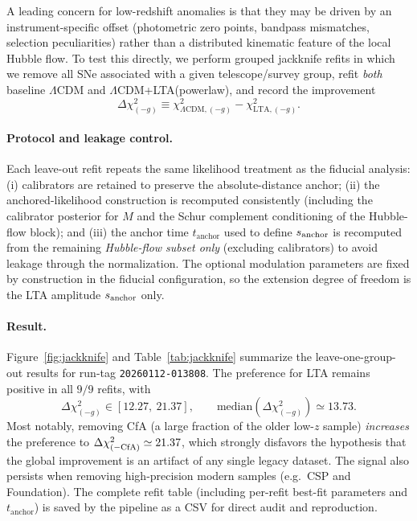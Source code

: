 \documentclass[10pt]{article}
\newcommand{\tA}{t_{\mathrm{anchor}}}
\begin{document}
A leading concern for low-redshift anomalies is that they may be driven by an instrument-specific
offset (photometric zero points, bandpass mismatches, selection peculiarities) rather than a
distributed kinematic feature of the local Hubble flow. To test this directly, we perform grouped
jackknife refits in which we remove all SNe associated with a given telescope/survey group,
refit \emph{both} baseline $\Lambda$CDM and $\Lambda$CDM+LTA(powerlaw), and record the improvement
\begin{equation}
\Delta\chi^2_{(-g)} \equiv
\chi^2_{\Lambda\mathrm{CDM},(-g)} - \chi^2_{\mathrm{LTA},(-g)}.
\end{equation}

\paragraph{Protocol and leakage control.}
Each leave-out refit repeats the same likelihood treatment as the fiducial analysis:
(i) calibrators are retained to preserve the absolute-distance anchor; (ii) the anchored-likelihood
construction is recomputed consistently (including the calibrator posterior for $M$ and the Schur
complement conditioning of the Hubble-flow block); and (iii) the anchor time $\tA$ used to define
\(s_{\rm anchor}\) is recomputed from the remaining \emph{Hubble-flow subset only} (excluding
calibrators) to avoid leakage through the normalization. The optional modulation parameters are
fixed by construction in the fiducial configuration, so the extension degree of freedom is the LTA
amplitude \(s_{\rm anchor}\) only.

\paragraph{Result.}
Figure~\ref{fig:jackknife} and Table~\ref{tab:jackknife} summarize the leave-one-group-out results
for run-tag \texttt{20260112-013808}. The preference for LTA remains positive in all $9/9$ refits,
with
\begin{equation}
\Delta\chi^2_{(-g)} \in [12.27,\ 21.37], \qquad
\mathrm{median}(\Delta\chi^2_{(-g)})\simeq 13.73.
\end{equation}
Most notably, removing CfA (a large fraction of the older low-$z$ sample) \emph{increases} the
preference to \(\Delta\chi^2_{(-{\rm CfA})}\simeq 21.37\), which strongly disfavors the hypothesis
that the global improvement is an artifact of any single legacy dataset. The signal also persists
when removing high-precision modern samples (e.g.\ CSP and Foundation). The complete refit table
(including per-refit best-fit parameters and \(\tA\)) is saved by the pipeline as a CSV for direct
audit and reproduction.
\end{document}
